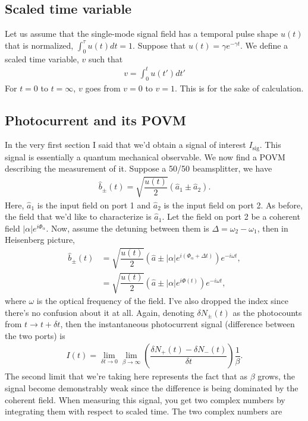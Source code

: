 \documentclass{article}
\begin{document}
\subsection{Scaled time variable}
Let us assume that the single-mode signal field has a temporal pulse shape $u(t)$ that is normalized, $\int_0^\tau u(t)dt= 1$. Suppose that $u(t)=\gamma e^{-\gamma t}$. We define a scaled time variable, $v$ such that
\begin{align}
    v = \int_0^t u(t')dt'
\end{align}
For $t=0$ to $t=\infty$, $v$ goes from $v=0$ to $v=1$. This is for the sake of calculation.
\subsection{Photocurrent and its POVM}
In the very first section I said that we'd obtain a signal of interest $I_{\text{sig}}$. This signal is essentially a quantum mechanical observable. We now find a POVM describing the measurement of it. Suppose a 50/50 beamsplitter, we have 
\begin{align}
    \hat{b}_{\pm}(t) = \sqrt{\dfrac{u(t)}{2}}\left(\hat{a}_1\pm\hat{a}_2\right).
\end{align}
Here, $\hat{a}_1$ is the input field on port 1 and $\hat{a}_2$ is the input field on port 2. As before, the field that we'd like to characterize is $\hat{a}_1$. Let the field on port 2 be a coherent field $|\alpha|e^{i\Phi_\alpha}$. Now, assume the detuning between them is $\Delta=\omega_2-\omega_1$, then in Heisenberg picture,
\begin{align}
    \hat{b}_{\pm}(t) &= \sqrt{\dfrac{u(t)}{2}}\left(\hat{a}\pm|\alpha|e^{i(\Phi_\alpha+\Delta t)}\right)e^{-i\omega t},\\
    &= \sqrt{\dfrac{u(t)}{2}}\left(\hat{a}\pm|\alpha|e^{i\Phi(t)}\right)e^{-i\omega t},
\end{align}
where $\omega$ is the optical frequency of the field. I've also dropped the index since there's no confusion about it at all. Again, denoting $\delta N_{\pm}(t)$ as the photocounts from $t\to t+\delta t$, then the instantaneous photocurrent signal (difference between the two ports) is
\begin{align}
    I(t) = \lim_{\delta t\to 0}\lim_{\beta\to\infty}\left(\dfrac{\delta N_+(t)-\delta N_{-}(t)}{\delta t}\right)\dfrac{1}{\beta}.
\end{align}
The second limit that we're taking here represents the fact that as $\beta$ grows, the signal become demonstrably weak since the difference is being dominated by the coherent field. When measuring this signal, you get two complex numbers by integrating them with respect to scaled time. The two complex numbers are 
\end{document}
